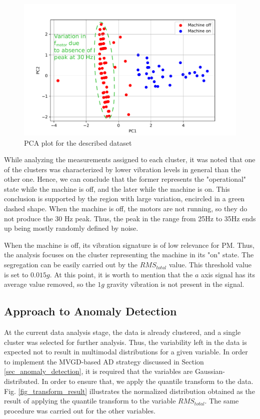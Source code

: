 \documentclass[conference]{IEEEtran}
\begin{document}
\begin{figure}[htbp]
\centerline{\includegraphics[width=0.9\columnwidth]{graphics/pca_result/pca_result.pdf}}
\caption{PCA plot for the described dataset}
\label{fig_pca_result}
\end{figure}

While analyzing the measurements assigned to each cluster, it was noted that one of the clusters was characterized by lower vibration levels in general than the other one. Hence, we can conclude that the former represents the "operational" state while the machine is off, and the later while the machine is on. This conclusion is supported by the region with large variation, encircled in a green dashed shape. When the machine is off, the motors are not running, so they do not produce the 30 Hz peak. Thus, the peak in the range from 25Hz to 35Hz ends up being mostly randomly defined by noise.

When the machine is off, its vibration signature is of low relevance for PM. Thus, the analysis focuses on the cluster representing the machine in its "on" state. The segregation can be easily carried out by the $RMS_{total}$ value. This threshold value is set to $0.015g$. At this point, it is worth to mention that the $a$ axis signal has its average value removed, so the $1g$ gravity vibration is not present in the signal.

\subsection{Approach to Anomaly Detection}
At the current data analysis stage, the data is already clustered, and a single cluster was selected for further analysis. Thus, the variability left in the data is expected not to result in multimodal distributions for a given variable. In order to implement the MVGD-based AD strategy discussed in Section \ref{sec_anomaly_detection}, it is required that the variables are Gaussian-distributed. In order to ensure that, we apply the quantile transform to the data. Fig. \ref{fig_transform_result} illustrates the normalized distribution obtained as the result of applying the quantile transform to the variable $RMS_{total}$. The same procedure was carried out for the other variables.
\end{document}
